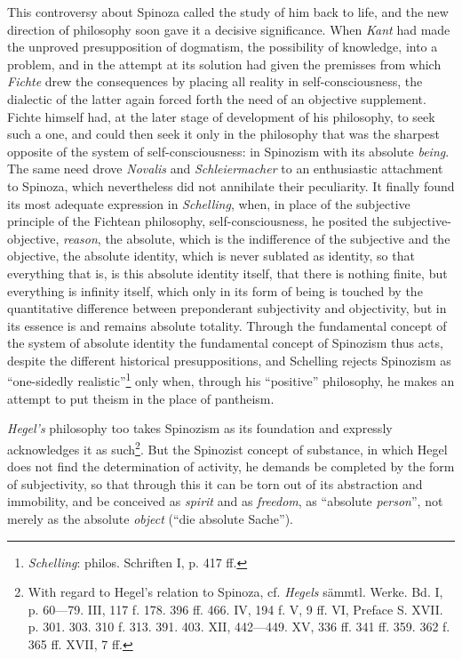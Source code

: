 \documentclass[12pt,a4paper,openany]{book}
\newcommand{\opage}[1]{\marginnote{\footnotesize\textit{[#1]}}}
\begin{document}
This controversy about Spinoza called the study of him back
to life, and the new direction of philosophy soon gave it a decisive
significance. When \emph{Kant} had made the
\opage{187}\setcounter{footnote}{0}unproved presupposition of dogmatism, the possibility of knowledge, into a problem,
and in the attempt at its solution had given the premisses
from which \emph{Fichte} drew the consequences by placing
all reality in self-consciousness, the dialectic of the latter
again forced forth the need of an objective supplement. Fichte
himself had, at the later stage of development of his philosophy,
to seek such a one, and could then seek it only in the philosophy
that was the sharpest opposite of the system of self-consciousness:
in Spinozism with its absolute \emph{being}. The
same need drove \emph{Novalis} and \emph{Schleiermacher} to an
enthusiastic attachment to Spinoza, which nevertheless did not annihilate
their peculiarity. It finally found its most adequate
expression in \emph{Schelling}, when, in place of the
subjective principle of the Fichtean philosophy, self-consciousness,
he posited the subjective-objective, \emph{reason}, the absolute, which
is the indifference of the subjective and the objective, the absolute
identity, which is never sublated as identity, so that
everything that is, is this absolute identity itself, that there
is nothing finite, but everything is infinity itself, which only
in its form of being is touched by the quantitative difference
between preponderant subjectivity and objectivity, but in its
essence is and remains absolute totality. Through the fundamental concept
of the system of absolute identity the fundamental concept of Spinozism
thus acts, despite the different historical presuppositions,
and Schelling rejects Spinozism as ``one-sidedly
realistic''\footnote{\emph{Schelling}: philos. Schriften I, p. 417 ff.} only when, through his ``positive'' philosophy, he makes an
attempt to put theism in the place of pantheism.

\emph{Hegel's} philosophy too takes Spinozism as its foundation
and expressly acknowledges it as such\footnote{With regard to Hegel's relation to Spinoza, cf. \emph{Hegels}
sämmtl. Werke. Bd. I, p. 60---79. III, 117 f. 178. 396 ff. 466.
IV, 194 f. V, 9 ff. VI, Preface S. XVII. p. 301. 303. 310 f.
313. 391. 403. XII, 442---449. XV, 336 ff. 341 ff. 359. 362 f.
365 ff. XVII, 7 ff.}. But
the Spinozist concept of substance, in which Hegel does not find
\opage{188}\setcounter{footnote}{0}the determination of activity, he demands be completed by
the form of subjectivity, so that through this it can be torn out
of its abstraction and immobility, and be conceived as \emph{spirit}
and as \emph{freedom}, as ``absolute \emph{person}'', not merely as
the absolute \emph{object} (``die absolute Sache'').
\end{document}
